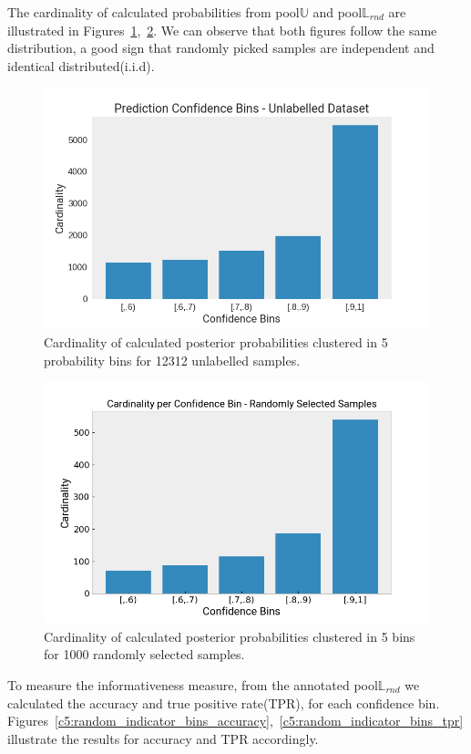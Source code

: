 The cardinality of calculated probabilities from pool$\mathbb{U}$ and pool$\mathbb{L}_{rnd}$ are illustrated in Figures~\ref{c5:fig_unlabelled_inference},~\ref{c5:fig_random_cardinality_bins}.
We can observe that both figures follow the same distribution, a good sign that randomly picked samples are independent and identical distributed(i.i.d).

\begin{figure}[ht!]
    \centering  
    \includegraphics[width=.5\textwidth]{figures/chap5/al/indicators/cardinality/pred_conf_unseen_dataset}
    \caption{Cardinality of calculated posterior probabilities clustered in 5 probability bins for 12312 unlabelled samples.}
    \label{c5:fig_unlabelled_inference}
\end{figure}


\begin{figure}[ht!]
    \centering  
    \includegraphics[width=.45\textwidth]{figures/chap5/al/indicators/cardinality/pred_conf_cardinality_random_1000}
    \caption{Cardinality of calculated posterior probabilities clustered in 5 bins for 1000 randomly selected samples.}
    \label{c5:fig_random_cardinality_bins}
\end{figure}

To measure the informativeness measure, from the annotated pool$\mathbb{L}_{rnd}$ we calculated the accuracy and true positive rate(TPR), for each confidence bin. Figures~\ref{c5:random_indicator_bins_accuracy},~\ref{c5:random_indicator_bins_tpr} illustrate the results for accuracy and TPR accordingly.

